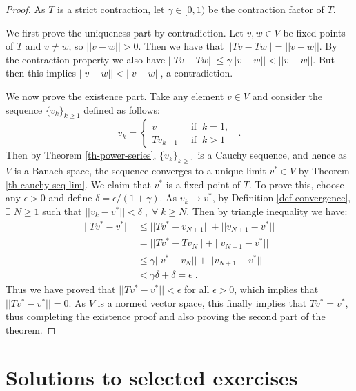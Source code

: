 \documentclass{article}
\theoremstyle{definition}
\theoremstyle{remark}
\begin{document}
\begin{proof}
As $T$ is a strict contraction, let $\gamma \in [0,1)$ be the contraction factor of $T$.

We first prove the uniqueness part by contradiction. Let $v,w \in V$ be fixed points of $T$ and $v \neq w$, so $||v - w|| > 0$. Then we have that $||Tv -Tw|| = ||v - w||$. By the contraction property we also have $||Tv - Tw|| \leq \gamma ||v - w|| < ||v - w||$. But then this implies $||v - w|| < ||v - w||$, a contradiction.

We now prove the existence part. Take any element $v \in V$ and consider the sequence $\{v_k\}_{k \geq 1}$ defined as follows:
\begin{equation}
v_k = 
\begin{cases}
v \;\; & \text{if} \;\; k = 1,\\
Tv_{k-1} \;\; & \text{if} \;\; k > 1
\end{cases}
\;\;.
\label{eq:ctc-map-proof-eq1}
\end{equation}
Then by Theorem \ref{th-power-series}, $\{v_k\}_{k \geq 1}$ is a Cauchy sequence, and hence as $V$ is a Banach space, the sequence converges to a unique limit $v^{\ast} \in V$ by Theorem \ref{th-cauchy-seq-lim}. We claim that $v^{\ast}$ is a fixed point of $T$. To prove this, choose any $\epsilon > 0$ and define $\delta = \epsilon / (1 + \gamma)$. As $v_k \rightarrow v^{\ast}$, by Definition \ref{def-convergence}, $\exists \; N \geq 1$ such that $||v_k - v^{\ast}|| < \delta \;,\; \forall \; k \geq N$. Then by triangle inequality we have:
\begin{equation}
\begin{split}
||Tv^{\ast} - v^{\ast}|| &\leq ||Tv^{\ast} - v_{N+1}|| + ||v_{N+1} - v^{\ast}|| \\
&= ||Tv^{\ast} - Tv_{N}|| + ||v_{N+1} - v^{\ast}|| \\
&\leq \gamma ||v^{\ast} - v_{N}|| + ||v_{N+1} - v^{\ast}|| \\
&< \gamma \delta + \delta = \epsilon \;.
\end{split}
\label{eq:ctc-map-proof-eq2}
\end{equation}
Thus we have proved that $||Tv^{\ast} - v^{\ast}|| < \epsilon$ for all $\epsilon > 0$, which implies that $||Tv^{\ast} - v^{\ast}|| = 0$. As $V$ is a normed vector space, this finally implies that $Tv^{\ast} = v^{\ast}$, thus completing the existence proof and also proving the second part of the theorem.
\end{proof}

\section{Solutions to selected exercises}
\label{solution}
\end{document}
